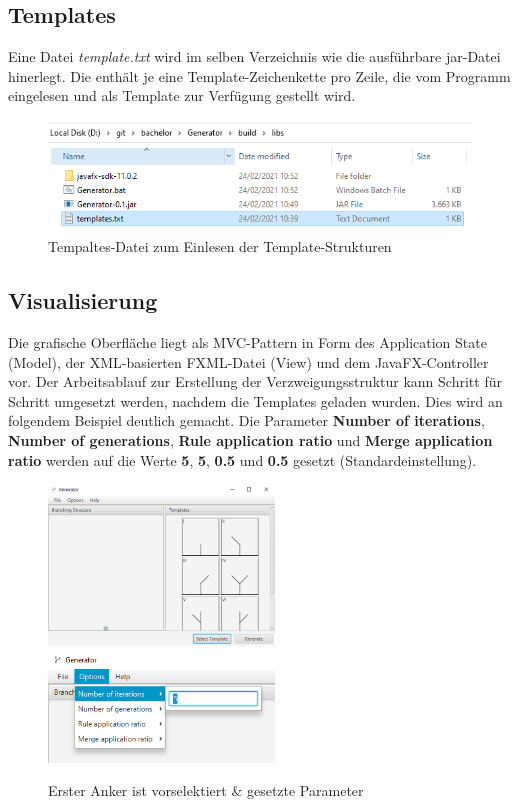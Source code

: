 \subsection*{Templates}
Eine Datei \textit{template.txt} wird im selben Verzeichnis wie die ausführbare jar-Datei hinerlegt.
Die enthält je eine Template-Zeichenkette pro Zeile, die vom Programm eingelesen und als Template
zur Verfügung gestellt wird.
\begin{figure}[H]
    \centering
    \includegraphics[width=12cm]{../images/templates_file.png}
    \caption{Tempaltes-Datei zum Einlesen der Template-Strukturen}
\end{figure}

\newpage

\subsection*{Visualisierung}
Die grafische Oberfläche liegt als MVC-Pattern in Form des Application State (Model), der XML-basierten FXML-Datei (View)
und dem JavaFX-Controller vor.
Der Arbeitsablauf zur Erstellung der Verzweigungsstruktur kann Schritt für Schritt umgesetzt werden, nachdem die Templates
geladen wurden.
Dies wird an folgendem Beispiel deutlich gemacht.
Die Parameter \textbf{Number of iterations}, \textbf{Number of generations}, \textbf{Rule application ratio} und
\textbf{Merge application ratio} werden auf die Werte \textbf{5}, \textbf{5}, \textbf{0.5} und \textbf{0.5} gesetzt
(Standardeinstellung).
\begin{figure}[H]
    \centering
    \includegraphics[width=6cm]{../images/UI_templates.png}
    \includegraphics[width=6cm]{../images/UI_parameters.png}
    \caption{Erster Anker ist vorselektiert \& gesetzte Parameter}
\end{figure}

